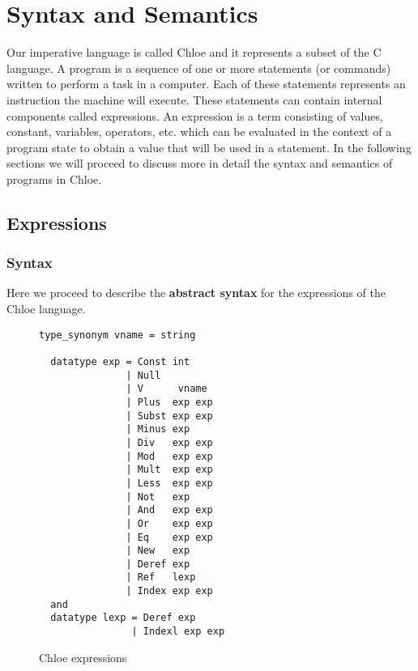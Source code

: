 \chapter{Syntax and Semantics}\label{chapter:semantics}

Our imperative language is called Chloe and it represents a subset of the C language.
A program is a sequence of one or more statements (or commands) written to perform a task in a computer.
Each of these statements represents an instruction the machine will execute.
These statements can contain internal components called expressions.
An expression is a term consisting of values, constant, variables, operators, etc. which can be evaluated in the context of a program state to obtain a value that will be used in a statement.
In the following sections we will proceed to discuss more in detail the syntax and semantics of programs in Chloe.


\section{Expressions}\label{section:expressions}

\subsection{Syntax}\label{subsection:syntax_expressions}

Here we proceed to describe the \textbf{abstract syntax} for the expressions of the Chloe language.

\begin{figure}
  \begin{lstlisting}[frame=single]
  type_synonym vname = string

  datatype exp = Const int
               | Null
               | V      vname
               | Plus  exp exp
               | Subst exp exp
               | Minus exp
               | Div   exp exp
               | Mod   exp exp
               | Mult  exp exp
               | Less  exp exp
               | Not   exp
               | And   exp exp
               | Or    exp exp
               | Eq    exp exp
               | New   exp
               | Deref exp
               | Ref   lexp
               | Index exp exp
  and
  datatype lexp = Deref exp
                | Indexl exp exp
  \end{lstlisting}

  \caption{Chloe expressions}
  \label{fig:chloe_expressions}
\end{figure}

